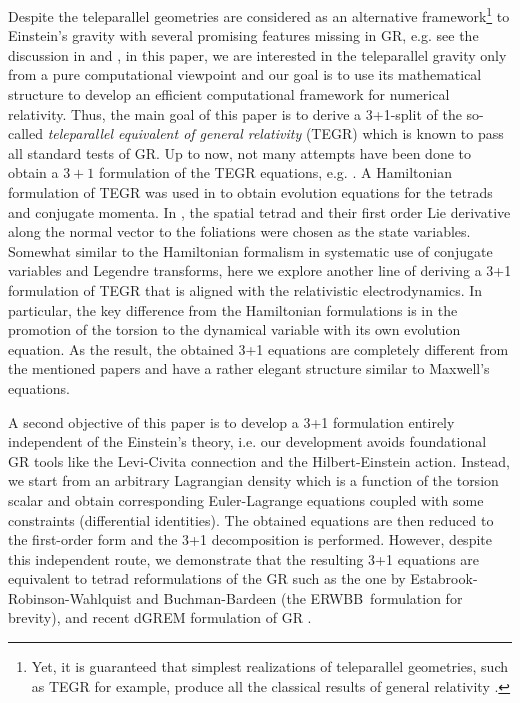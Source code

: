\documentclass[
10pt, %
a4paper, %
oneside, %
twocolumn,
headinclude,footinclude, %
BCOR5mm, %
]{scrartcl}
\newcommand{\ERWBB}{{ERWBB}}
\begin{document}
	Despite the teleparallel geometries are considered as an alternative
	framework\footnote{Yet, it is guaranteed that simplest realizations of
	teleparallel geometries, such as TEGR for example, produce all the classical
	results of general relativity \cite{AldrovandiPereiraBook,Bahamonde2021a}.}
	to Einstein's gravity with several promising features missing in GR, e.g.
	see the discussion in \cite[Sec.18]{AldrovandiPereiraBook} and
	\cite{Cai2016}, in this paper, we are interested in the teleparallel gravity
	only from a pure computational viewpoint and our goal is to use its
	mathematical structure to develop an efficient computational framework for
	numerical relativity. Thus, the main goal of this paper is to derive a
	3+1-split of the so-called \emph{teleparallel equivalent of general
	relativity} (TEGR) \cite{AldrovandiPereiraBook,Krssak2019} which is known to
	pass all standard tests of GR. Up to now, not many attempts have been done
	to obtain a $ 3+1 $ formulation of the TEGR equations, e.g.
	\cite{Maluf2001a,Capozziello2021,Pati2022}. A Hamiltonian formulation of
	TEGR was used in \cite{Maluf2001a,Pati2022} to obtain evolution equations
	for the tetrads and conjugate momenta. In \cite{Capozziello2021}, the
	spatial tetrad and their first order Lie derivative along the normal vector
	to the foliations were chosen as the state variables. Somewhat similar to
	the Hamiltonian formalism in systematic use of conjugate variables and
	Legendre transforms, here we explore another line of deriving a 3+1
	formulation of TEGR that is aligned with the relativistic
	electrodynamics. In particular, the key difference from the Hamiltonian
	formulations \cite{Maluf2001a,Pati2022} is in the promotion of the torsion
	to the dynamical variable with its own evolution equation. As the result,
	the obtained 3+1 equations are completely different from the mentioned
	papers and have a rather elegant structure similar to Maxwell's equations.

	A second objective of this paper is to develop a 3+1 formulation entirely
	independent of the Einstein's theory, i.e. our development avoids
	foundational GR tools like the Levi-Civita connection and the
	Hilbert-Einstein action. Instead, we start from an arbitrary Lagrangian
	density which is a function of the torsion scalar and obtain corresponding
	Euler-Lagrange equations coupled with some constraints (differential
	identities). The obtained equations are then reduced to the first-order form
	and the 3+1 decomposition is performed. However, despite this independent
	route, we demonstrate that the resulting 3+1 equations are equivalent to
	tetrad reformulations of the GR such as the one by
	Estabrook-Robinson-Wahlquist \cite{Estabrook1997} and Buchman-Bardeen
	\cite{Buchman2003} (the \ERWBB\ formulation for brevity), and recent dGREM formulation of GR \cite{Olivares2022}. 
	
\end{document}
